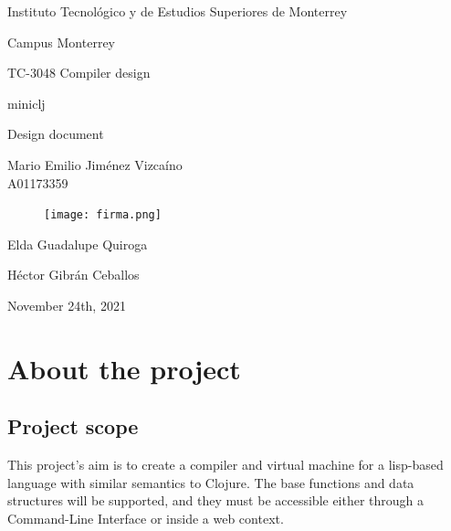 \documentclass[11pt]{scrreprt}
\begin{document}
\begin{titlepage}
    \centering
    \vspace{4\baselineskip}
    Instituto Tecnológico y de Estudios Superiores de Monterrey\par
    Campus Monterrey\par
    \vspace{2\baselineskip}
    {\large
    TC-3048 Compiler design}\par
    \vspace{6\baselineskip}
    {\huge
    miniclj\par}
    {\LARGE
    Design document\par}
    \vspace{4\baselineskip}
    {\Large
    Mario Emilio Jiménez Vizcaíno\\ A01173359\par}
    \begin{figure}[H]
      \centering
      \texttt{[image: firma.png]}
    \end{figure}
    \vfill
    Elda Guadalupe Quiroga\par
    Héctor Gibrán Ceballos\par
    \vspace{4\baselineskip}
    November 24th, 2021
\end{titlepage}

\pagebreak

\tableofcontents

\pagebreak

\chapter{About the project}
\section{Project scope}
This project's aim is to create a compiler and virtual machine for a lisp-based language with similar semantics to Clojure. The base functions and data structures will be supported, and they must be accessible either through a Command-Line Interface or inside a web context.
\end{document}
